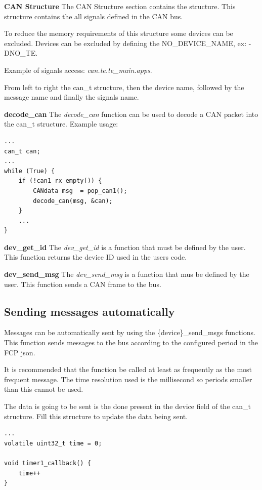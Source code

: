 \documentclass[11pt, a4paper]{article}
\begin{document}
\par{\textbf{{CAN Structure}} The CAN Structure section contains the
	 structure. This structure contains the all signals defined
	in the CAN bus.

	To reduce the memory requirements of this structure some devices can be
	excluded. Devices can be excluded by defining the NO\_{DEVICE\_NAME}, ex:
	-DNO\_TE.

Example of signals access: \textit{can.te.te\_main.apps}.

From left to right the can\_t structure, then the device name, followed by the
message name and finally the signals name.

\par{\textbf{decode\_can}} The \textit{decode\_can} function can be used to
decode a CAN packet into the can\_t structure. Example usage:
\begin{verbatim}
...
can_t can;
...
while (True) {
	if (!can1_rx_empty()) {
		CANdata msg  = pop_can1();
		decode_can(msg, &can);
	}
	...
}
\end{verbatim}

\par{\textbf{dev\_get\_id}}
The \textit{dev\_get\_id} is a function that must be defined by the user. This
function returns the device ID used in the users code.

\par{\textbf{dev\_send\_msg}} The \textit{dev\_send\_msg} is a function that
mus be defined by the user. This function sends a CAN frame to the bus.

\subsection{Sending messages automatically}
Messages can be automatically sent by using the \{device\}\_send\_msgs functions.
This function sends messages to the bus according to the configured period in
the FCP json.

It is recommended that the function be called at least as frequently as the most frequent message. 
The time resolution used is the millisecond so periods smaller than this cannot be used.

The data is going to be sent is the done present in the device field of the can\_t structure. Fill this structure to update the data being sent.

\begin{verbatim}
...
volatile uint32_t time = 0;

void timer1_callback() {
	time++
}


\end{verbatim}}
\end{document}
